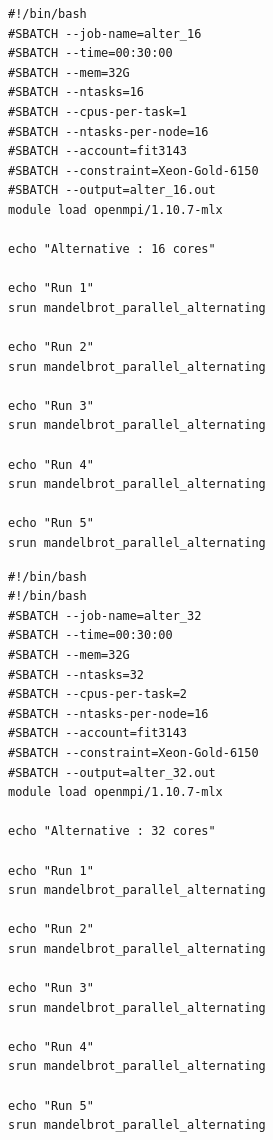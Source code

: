 \documentclass[conference]{IEEEtran}
\begin{document}
\begin{lstlisting}[caption={MonARCH job script for 16 cores},label={16job}]
#!/bin/bash
#SBATCH --job-name=alter_16
#SBATCH --time=00:30:00
#SBATCH --mem=32G
#SBATCH --ntasks=16
#SBATCH --cpus-per-task=1
#SBATCH --ntasks-per-node=16
#SBATCH --account=fit3143
#SBATCH --constraint=Xeon-Gold-6150
#SBATCH --output=alter_16.out
module load openmpi/1.10.7-mlx

echo "Alternative : 16 cores"

echo "Run 1"
srun mandelbrot_parallel_alternating

echo "Run 2"
srun mandelbrot_parallel_alternating

echo "Run 3"
srun mandelbrot_parallel_alternating

echo "Run 4"
srun mandelbrot_parallel_alternating

echo "Run 5"
srun mandelbrot_parallel_alternating

\end{lstlisting}

\begin{lstlisting}[caption={MonARCH job script for 32 cores},label={32job}]
#!/bin/bash
#!/bin/bash
#SBATCH --job-name=alter_32
#SBATCH --time=00:30:00
#SBATCH --mem=32G
#SBATCH --ntasks=32
#SBATCH --cpus-per-task=2
#SBATCH --ntasks-per-node=16
#SBATCH --account=fit3143
#SBATCH --constraint=Xeon-Gold-6150
#SBATCH --output=alter_32.out
module load openmpi/1.10.7-mlx

echo "Alternative : 32 cores"

echo "Run 1"
srun mandelbrot_parallel_alternating

echo "Run 2"
srun mandelbrot_parallel_alternating

echo "Run 3"
srun mandelbrot_parallel_alternating

echo "Run 4"
srun mandelbrot_parallel_alternating

echo "Run 5"
srun mandelbrot_parallel_alternating



\end{lstlisting}
\end{document}

